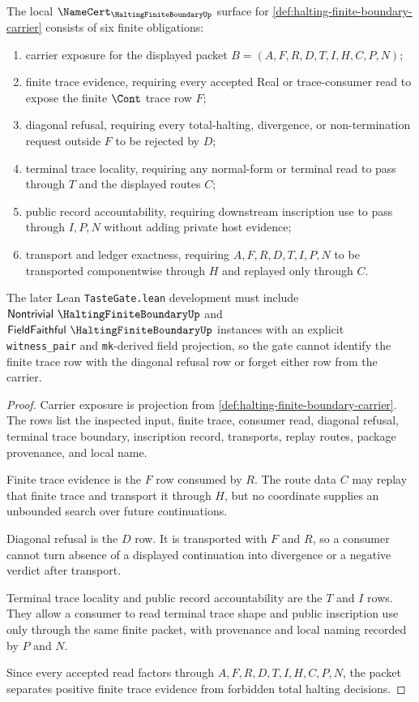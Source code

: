 \begin{theorem}
\label{thm:halting-finite-boundary-namecert-obligations}
The local $\NameCert_{\HaltingFiniteBoundaryUp}$ surface for \autoref{def:halting-finite-boundary-carrier} consists of six finite obligations:
\begin{enumerate}
\item carrier exposure for the displayed packet $B=(A,F,R,D,T,I,H,C,P,N)$;
\item finite trace evidence, requiring every accepted Real or trace-consumer read to expose the finite $\Cont$ trace row $F$;
\item diagonal refusal, requiring every total-halting, divergence, or non-termination request outside $F$ to be rejected by $D$;
\item terminal trace locality, requiring any normal-form or terminal read to pass through $T$ and the displayed routes $C$;
\item public record accountability, requiring downstream inscription use to pass through $I,P,N$ without adding private host evidence;
\item transport and ledger exactness, requiring $A,F,R,D,T,I,P,N$ to be transported componentwise through $H$ and replayed only through $C$.
\end{enumerate}
The later Lean \texttt{TasteGate.lean} development must include $\mathsf{Nontrivial}\ \HaltingFiniteBoundaryUp$ and $\mathsf{FieldFaithful}\ \HaltingFiniteBoundaryUp$ instances with an explicit \texttt{witness\_pair} and \texttt{mk}-derived field projection, so the gate cannot identify the finite trace row with the diagonal refusal row or forget either row from the carrier.
\end{theorem}
\begin{proof}
Carrier exposure is projection from \autoref{def:halting-finite-boundary-carrier}. The rows list the inspected input, finite trace, consumer read, diagonal refusal, terminal trace boundary, inscription record, transports, replay routes, package provenance, and local name.

Finite trace evidence is the $F$ row consumed by $R$. The route data $C$ may replay that finite trace and transport it through $H$, but no coordinate supplies an unbounded search over future continuations.

Diagonal refusal is the $D$ row. It is transported with $F$ and $R$, so a consumer cannot turn absence of a displayed continuation into divergence or a negative verdict after transport.

Terminal trace locality and public record accountability are the $T$ and $I$ rows. They allow a consumer to read terminal trace shape and public inscription use only through the same finite packet, with provenance and local naming recorded by $P$ and $N$.

Since every accepted read factors through $A,F,R,D,T,I,H,C,P,N$, the packet separates positive finite trace evidence from forbidden total halting decisions.
\end{proof}

